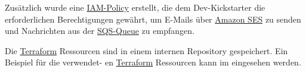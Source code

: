 Zusätzlich wurde eine \hyperlink{SES}{\textcolor{AOBlau}{IAM-Policy}} erstellt, die dem Dev-Kickstarter die erforderlichen Berechtigungen gewährt, um E-Mails über \hyperlink{SES}{\textcolor{AOBlau}{Amazon SES}} zu senden und Nachrichten aus der \hyperlink{SQS}{\textcolor{AOBlau}{SQS-Queue}} zu empfangen. 

Die \hyperlink{Terraform}{\textcolor{AOBlau}{Terraform}} Ressourcen sind in einem internen Repository gespeichert. Ein Beispiel für die verwendet-
en \hyperlink{Terraform}{\textcolor{AOBlau}{Terraform}} Ressourcen kann im  eingesehen werden.
